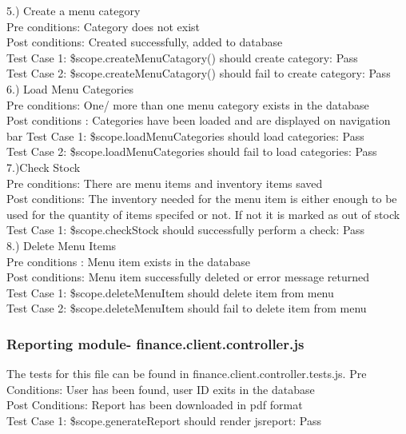 \documentclass[a4paper,12pt]{report}
\begin{document}
5.) Create a menu category \\ 
Pre conditions: Category does not exist \\
Post conditions: Created successfully, added to database\\
Test Case 1: \$scope.createMenuCatagory() should create category: Pass \\
Test Case 2: \$scope.createMenuCatagory() should fail to create category: Pass \\

6.) Load Menu Categories \\
Pre conditions: One/ more than one menu category exists in the database \\
Post conditions : Categories have been loaded and are displayed on navigation bar 
Test Case 1: \$scope.loadMenuCategories should load categories: Pass \\
Test Case 2: \$scope.loadMenuCategories should fail to load categories: Pass \\

7.)Check Stock \\
Pre conditions: There are menu items and inventory items saved\\
Post conditions: The inventory needed for the menu item is either enough to be used for the quantity of items specifed or not. If not it is marked as out of stock\\
Test Case 1: \$scope.checkStock should successfully perform a check: Pass \\  

8.) Delete Menu Items \\
Pre conditions : Menu item exists in the database \\
Post conditions: Menu item successfully deleted or error message returned \\
Test Case 1: \$scope.deleteMenuItem should delete item from menu \\
Test Case 2: \$scope.deleteMenuItem should fail to delete item from menu \\

\subsubsection{ Reporting module- finance.client.controller.js}
The tests for this file can be found in finance.client.controller.tests.js.
Pre Conditions: User has been found, user ID exits in the database \\
Post Conditions: Report has been downloaded in pdf format\\
Test Case 1: \$scope.generateReport should render jsreport: Pass \\
\end{document}
